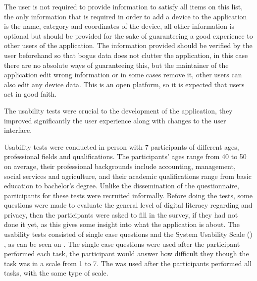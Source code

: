 The user is not required to provide information to satisfy all items on this list, the
only information that is required in order to add a device to the application is
the name, category and coordinates of the device, all other
information is optional but should be provided for the sake of guaranteeing a good
experience to other users of the application. The information provided
should be verified by the user beforehand so that bogus data does not clutter
the application, in this case there are no absolute ways of guaranteeing this,
but the maintainer of the application edit wrong information or in some
cases remove it, other users can also edit any device data. This is an
open platform, so it is expected that users act in good faith.

The usability tests were crucial to the development of the application,
they improved significantly the user experience along with changes to the
user interface.

Usability tests were conducted in person with 7 participants of different
ages, professional fields and qualifications. The participants' ages range
from 40 to 50 on average, their professional backgrounds include accounting,
management, social services and agriculture, and their academic qualifications range from
basic education to bachelor's degree. Unlike the dissemination of the questionnaire,
participants for these tests were recruited informally. Before doing the tests,
some questions were made to evaluate the general level of digital literacy
regarding \hyperlink{\acronym}{\acronym} and privacy, then the participants were asked to fill in the
survey, if they had not done it yet, as this gives some insight into what the
application is about. The usability tests consisted of single ease
questions \cite{tedesco2006comparison}
and the System Usability Scale (\hyperlink{\acronym}{\acronym}) \cite{brooke1996sus}, as can be seen on .
The single ease questions were used after the participant performed each task, the
participant would answer how difficult they though the task was in a
scale from 1 to 7. The \hyperlink{\acronym}{\acronym} was used after the participants
performed all tasks, with the same type of scale.
